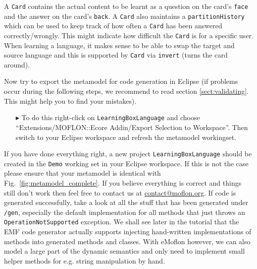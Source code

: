 A \texttt{Card} contains the actual content to be learnt as a question on the card's \texttt{face} and the answer on the card's \texttt{back}.
A \texttt{Card} also maintains a \texttt{partition\-History} which can be used to keep track of how often a \texttt{Card} has been answered correctly/wrongly.
This might indicate how difficult the \texttt{Card} is for a specific user.
When learning a language, it makes sense to be able to swap the target and source language and this is supported by \texttt{Card} via \texttt{invert} (turns the card around).

Now try to export the metamodel for code generation in Eclipse (if problems occur during the following steps, we recommend to read section \ref{sect:validating}. This might help you to find your mistakes).

\begin{enumerate}
\item[$\blacktriangleright$] To do this right-click on \texttt{LearningBoxLanguage} and choose ``Extensions/MOFLON::Ecore Addin/Export Selection to Workspace''.
Then switch to your Eclipse work\-space and refresh the metamodel workingset.
\end{enumerate}


If you have done everything right, a new project \texttt{LearningBoxLanguage} should be created in the \texttt{Demo} working set in your Eclipse workspace.
If this is not the case please ensure that your metamodel is identical with Fig.~\ref{fig:metamodel_complete}.
If you believe everything is correct and things still don't work then feel free to contact us at \href{mailto:contact@moflon.org}{contact@moflon.org}.
If code is generated successfully, take a look at all the stuff that has been generated under \texttt{/gen}, especially the default  implementation for all methods that just throws an  \texttt{OperationNotSupported} exception.
We shall see later in the tutorial that the EMF code generator actually supports injecting hand-written implementations of methods into generated methods and classes.
With eMoflon however, we can also model a large part of the dynamic semantics and only need to implement small helper methods for e.g. string manipulation by hand.
